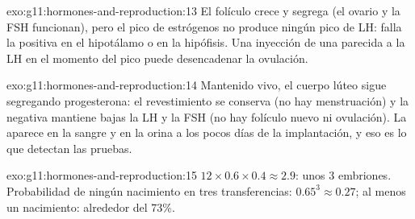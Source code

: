 \begin{solution}{exo:g11:hormones-and-reproduction:13}
El folículo crece y segrega (el ovario y la FSH funcionan), pero el
pico de estrógenos no produce ningún pico de LH: falla la
 positiva en el hipotálamo o en la hipófisis. Una
inyección de una  parecida a la LH en el momento del pico puede
desencadenar la ovulación.
\end{solution}

\begin{solution}{exo:g11:hormones-and-reproduction:14}
Mantenido vivo, el cuerpo lúteo sigue segregando progesterona: el
revestimiento se conserva (no hay menstruación) y la 
negativa mantiene bajas la LH y la FSH (no hay folículo nuevo ni
ovulación). La  aparece en la sangre y en la orina a los pocos
días de la implantación, y eso es lo que detectan las pruebas.
\end{solution}

\begin{solution}{exo:g11:hormones-and-reproduction:15}
$12 \times 0.6 \times 0.4 \approx 2.9$: unos 3 embriones. Probabilidad
de ningún nacimiento en tres transferencias: $0.65^3 \approx 0.27$; al
menos un nacimiento: alrededor del 73\%.
\end{solution}

